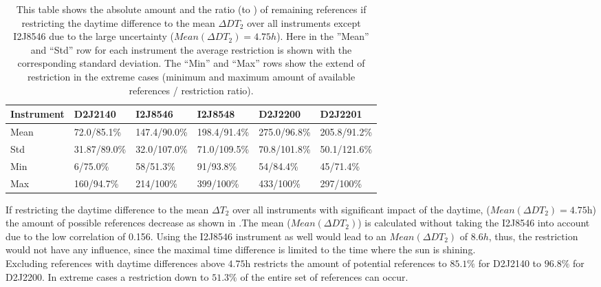 	\begin{table}
	\centering
		\begin{tabular}{|p{1.8cm}|p{2.15cm}|p{2.15cm}|p{2.15cm}|p{2.15cm}|p{2.15cm}|}
		Instrument	&D2J2140&I2J8546& I2J8548&D2J2200&D2J2201\\
		\toprule
		Mean&
		72.0/85.1\% &		147.4/90.0\%&
		198.4/91.4\%&		275.0/96.8\%&
		205.8/91.2\%\\
		\midrule
		Std&		31.87/89.0\%&32.0/107.0\%&
		71.0/109.5\%&		70.8/101.8\%&
		50.1/121.6\% \\
		\midrule
		Min&
		6/75.0\%&		58/51.3\%
		&91/93.8\%		&54/84.4\%
		&45/71.4\%\\
		\midrule
		Max&
		160/94.7\% &
		214/100\% &
		399/100\% &
		433/100\% &
		297/100\% \\
		\bottomrule
	\end{tabular}
	\caption{This table shows the absolute amount and the ratio (to ) of remaining references if restricting the daytime difference to the mean $\Delta DT_{2}$ over all instruments except I2J8546 due to the large uncertainty ($Mean(\Delta DT_{2}) = 4.75h$). Here in the ”Mean” and “Std” row for each  instrument the average restriction is shown with the corresponding standard deviation. The “Min” and “Max” rows show the extend of restriction in the extreme cases (minimum and maximum amount of available references / restriction ratio).}
	\label{tab:daytimerest}
\end{table}	
If restricting the daytime difference to the mean $\Delta T_{2}$ over all instruments with significant impact of the daytime, ($Mean(\Delta DT_{2}) = 4.75$h) the amount of possible references decrease as shown in .The mean ($Mean(\Delta DT_{2})$) is calculated without taking the I2J8546 into account due to the low correlation of 0.156. Using the I2J8546 instrument as well would lead to an  $Mean(\Delta DT_{2})$ of $8.6h$, thus, the restriction would not have any influence, since the maximal time difference is limited to the time where the sun is shining.\\ 
Excluding references with daytime differences above $4.75$h restricts the amount of potential references to $85.1\%$ for D2J2140 to $96.8\%$ for D2J2200. In extreme cases a restriction down to $51.3\%$ of the entire set of references can occur.
	
